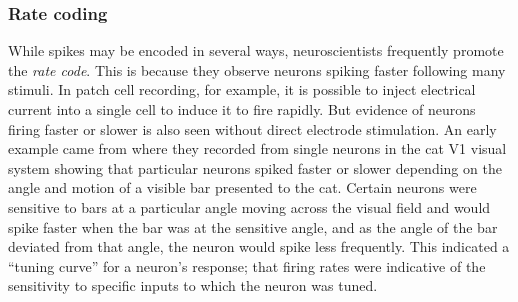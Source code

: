 

 
 
\subsubsection{Rate coding}

While spikes may be encoded in several ways, neuroscientists frequently promote the \emph{rate code}.
This is because they observe neurons spiking faster following many stimuli.
In patch cell recording, for example, it is possible to inject electrical current into a single cell to induce it to fire rapidly.
But evidence of neurons firing faster or slower is also seen without direct electrode stimulation.
An early example came from \citet{hubelReceptiveFieldsSingle1959} where they recorded from single neurons in the cat V1 visual system showing that particular neurons spiked faster or slower depending on the angle and motion of a visible bar presented to the cat.
Certain neurons were sensitive to bars at a particular angle moving across the visual field and would spike faster when the bar was at the sensitive angle, and as the angle of the bar deviated from that angle, the neuron would spike less frequently.
This indicated a ``tuning curve'' for a neuron's response; that firing rates were indicative of the sensitivity to specific inputs to which the neuron was tuned.

